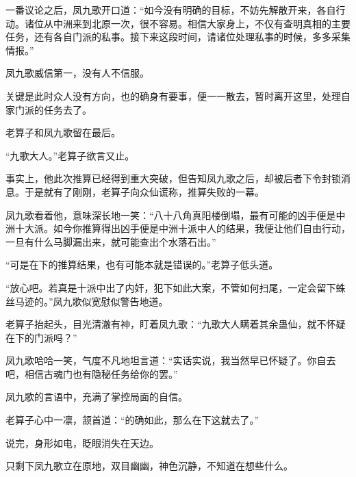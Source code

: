 \begin{this_body}
一番议论之后，凤九歌开口道：“如今没有明确的目标，不妨先解散开来，各自行动。诸位从中洲来到北原一次，很不容易。相信大家身上，不仅有查明真相的主要任务，还有各自门派的私事。接下来这段时间，请诸位处理私事的时候，多多采集情报。”

凤九歌威信第一，没有人不信服。

关键是此时众人没有方向，也的确身有要事，便一一散去，暂时离开这里，处理自家门派的任务去了。

老算子和凤九歌留在最后。

“九歌大人。”老算子欲言又止。

事实上，他此次推算已经得到重大突破，但告知凤九歌之后，却被后者下令封锁消息。于是就有了刚刚，老算子向众仙谎称，推算失败的一幕。

凤九歌看着他，意味深长地一笑：“八十八角真阳楼倒塌，最有可能的凶手便是中洲十大派。如今你推算得出凶手便是中洲十派中人的结果，我便让他们自由行动，一旦有什么马脚漏出来，就可能查出个水落石出。”

“可是在下的推算结果，也有可能本就是错误的。”老算子低头道。

“放心吧。若真是十派中出了内奸，犯下如此大案，不管如何扫尾，一定会留下蛛丝马迹的。”凤九歌似宽慰似警告地道。

老算子抬起头，目光清澈有神，盯着凤九歌：“九歌大人瞒着其余蛊仙，就不怀疑在下的门派吗？”

凤九歌哈哈一笑，气度不凡地坦言道：“实话实说，我当然早已怀疑了。你自去吧，相信古魂门也有隐秘任务给你的罢。”

凤九歌的言语中，充满了掌控局面的自信。

老算子心中一凛，颔首道：“的确如此，那么在下这就去了。”

说完，身形如电，眨眼消失在天边。

只剩下凤九歌立在原地，双目幽幽，神色沉静，不知道在想些什么。

\end{this_body}

